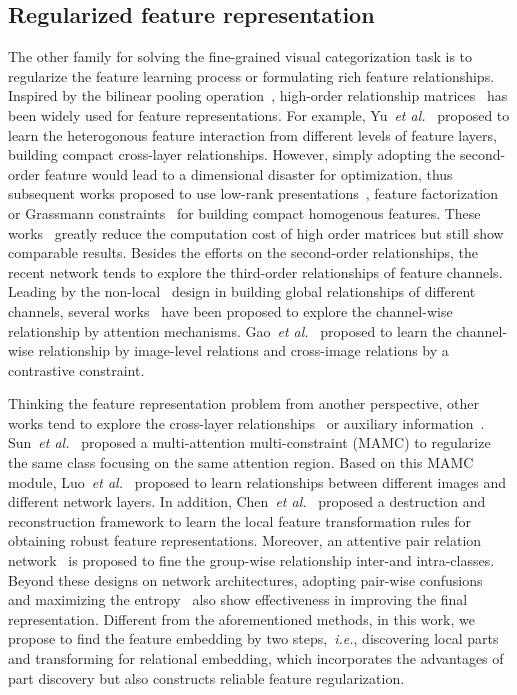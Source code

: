 \documentclass[journal]{IEEEtran}
\def\ie{{\em i.e.}}
\def\etal{{\em et al.}}
\begin{document}
\subsection{Regularized feature representation} The other family for solving the fine-grained visual categorization task is to regularize the feature learning process or formulating rich feature relationships. Inspired by the bilinear pooling operation~\cite{lin2015bilinear}, high-order relationship matrices~\cite{yu2018hierarchical,zhang2019learning,zheng2019looking,zhao2021graph,du2020fine} has been widely used for feature representations. For example, Yu~\etal~\cite{yu2018hierarchical} proposed to learn the heterogonous feature interaction from different levels of feature layers, building compact cross-layer relationships.
However, simply adopting the second-order feature would lead to a dimensional disaster for optimization, thus subsequent works proposed to use low-rank presentations~\cite{kong2017low}, feature factorization~\cite{li2017factorized} or Grassmann constraints~\cite{wei2018grassmann} for building compact homogenous features.
These works~\cite{kong2017low,li2017factorized,wei2018grassmann} greatly reduce the computation cost of high order matrices but still show comparable results.
Besides the efforts on the second-order relationships, the recent network tends to explore the third-order relationships of feature channels. Leading by the non-local~\cite{wang2018non} design in building global relationships of different channels, several works~\cite{zheng2019looking,gao2020channel} have been proposed to explore the channel-wise relationship by attention mechanisms. Gao~\etal~\cite{gao2020channel} proposed to learn the channel-wise relationship by image-level relations and cross-image relations by a contrastive constraint.

Thinking the feature representation problem from another perspective, other works tend to explore the cross-layer relationships~\cite{chang2020devil,zheng2017learning,sun2018multi,luo2019cross,wang2018learning,ji2020attention} or auxiliary information~\cite{aodha19presence}.
Sun~\etal~\cite{sun2018multi} proposed a multi-attention multi-constraint (MAMC) to regularize the same class focusing on the same attention region.
Based on this MAMC module, Luo~\etal~\cite{luo2019cross} proposed to learn relationships between different images and different network layers.
In addition, Chen~\etal~\cite{chen2019destruction} proposed a destruction and reconstruction framework to learn the local feature transformation rules for obtaining robust feature representations. Moreover, an attentive pair relation network~\cite{zhang2020learning} is proposed to fine the group-wise relationship inter-and intra-classes.
Beyond these designs on network architectures, adopting pair-wise confusions~\cite{dubey2018pairwise} and maximizing the entropy~\cite{dubey2018maximum} also show effectiveness in improving the final representation.
Different from the aforementioned methods, in this work, we propose to find the feature embedding by two steps,~\ie, discovering local parts and transforming for relational embedding, which incorporates the advantages of part discovery but also constructs reliable feature regularization.
\end{document}
